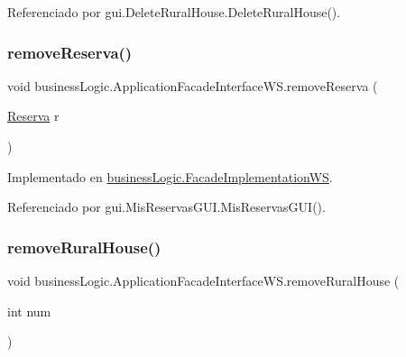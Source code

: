 Referenciado por gui.\+Delete\+Rural\+House.\+Delete\+Rural\+House().

\mbox{\label{interfacebusiness_logic_1_1_application_facade_interface_w_s_a0c4ed4fa98351e6aaba6f9769e561abf}} 
\subsubsection{\texorpdfstring{removeReserva()}{removeReserva()}}
{\footnotesize\ttfamily void business\+Logic.\+Application\+Facade\+Interface\+W\+S.\+remove\+Reserva (\begin{DoxyParamCaption}\item[{\mbox{\hyperlink{classdomain_1_1_reserva}{Reserva}}}]{r }\end{DoxyParamCaption})}



Implementado en \mbox{\hyperlink{classbusiness_logic_1_1_facade_implementation_w_s_ae4cb91caac6aed10801d61b70702fd30}{business\+Logic.\+Facade\+Implementation\+WS}}.



Referenciado por gui.\+Mis\+Reservas\+G\+U\+I.\+Mis\+Reservas\+G\+U\+I().

\mbox{\label{interfacebusiness_logic_1_1_application_facade_interface_w_s_a472d0eae303dc4ad989f382bb0632afc}} 
\subsubsection{\texorpdfstring{removeRuralHouse()}{removeRuralHouse()}}
{\footnotesize\ttfamily void business\+Logic.\+Application\+Facade\+Interface\+W\+S.\+remove\+Rural\+House (\begin{DoxyParamCaption}\item[{int}]{num }\end{DoxyParamCaption})}



